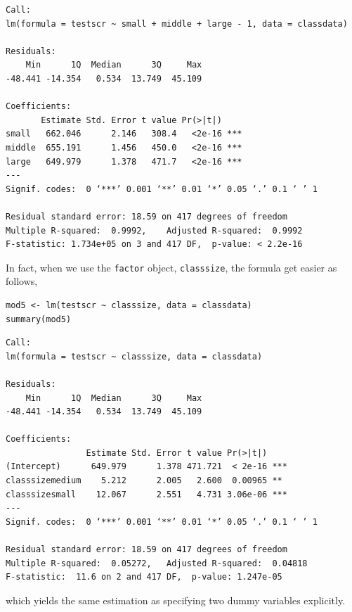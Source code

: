 \documentclass[11pt]{article}
\begin{document}
\begin{verbatim}
Call:
lm(formula = testscr ~ small + middle + large - 1, data = classdata)

Residuals:
    Min      1Q  Median      3Q     Max
-48.441 -14.354   0.534  13.749  45.109

Coefficients:
       Estimate Std. Error t value Pr(>|t|)
small   662.046      2.146   308.4   <2e-16 ***
middle  655.191      1.456   450.0   <2e-16 ***
large   649.979      1.378   471.7   <2e-16 ***
---
Signif. codes:  0 ‘***’ 0.001 ‘**’ 0.01 ‘*’ 0.05 ‘.’ 0.1 ‘ ’ 1

Residual standard error: 18.59 on 417 degrees of freedom
Multiple R-squared:  0.9992,	Adjusted R-squared:  0.9992
F-statistic: 1.734e+05 on 3 and 417 DF,  p-value: < 2.2e-16
\end{verbatim}

In fact, when we use the \texttt{factor} object, \texttt{classsize}, the formula get
easier as follows,

\begin{verbatim}
mod5 <- lm(testscr ~ classsize, data = classdata)
summary(mod5)
\end{verbatim}

\begin{verbatim}
Call:
lm(formula = testscr ~ classsize, data = classdata)

Residuals:
    Min      1Q  Median      3Q     Max
-48.441 -14.354   0.534  13.749  45.109

Coefficients:
                Estimate Std. Error t value Pr(>|t|)
(Intercept)      649.979      1.378 471.721  < 2e-16 ***
classsizemedium    5.212      2.005   2.600  0.00965 **
classsizesmall    12.067      2.551   4.731 3.06e-06 ***
---
Signif. codes:  0 ‘***’ 0.001 ‘**’ 0.01 ‘*’ 0.05 ‘.’ 0.1 ‘ ’ 1

Residual standard error: 18.59 on 417 degrees of freedom
Multiple R-squared:  0.05272,	Adjusted R-squared:  0.04818
F-statistic:  11.6 on 2 and 417 DF,  p-value: 1.247e-05
\end{verbatim}

which yields the same estimation as specifying two dummy variables
explicitly.
\end{document}
